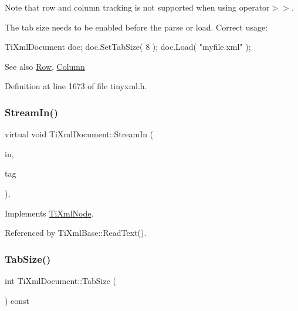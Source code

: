 Note that row and column tracking is not supported when using operator$>$$>$.

The tab size needs to be enabled before the parse or load. Correct usage\+: \begin{DoxyVerb}TiXmlDocument doc;
doc.SetTabSize( 8 );
doc.Load( "myfile.xml" );
\end{DoxyVerb}


\begin{DoxySeeAlso}{See also}
\hyperlink{class_ti_xml_base_ad0cacca5d76d156b26511f46080b442e}{Row}, \hyperlink{class_ti_xml_base_ad283b95d9858d5d78c334f4a61b07bb4}{Column} 
\end{DoxySeeAlso}


Definition at line 1673 of file tinyxml.\+h.

\hypertarget{class_ti_xml_document_ab6d70b2c19e46aedb9903b3c3aa2a568}{}\label{class_ti_xml_document_ab6d70b2c19e46aedb9903b3c3aa2a568} 
\subsubsection{\texorpdfstring{Stream\+In()}{StreamIn()}}
{\footnotesize\ttfamily virtual void Ti\+Xml\+Document\+::\+Stream\+In (\begin{DoxyParamCaption}\item[{std\+::istream $\ast$}]{in,  }\item[{\hyperlink{tinyxml_8h_a92bada05fd84d9a0c9a5bbe53de26887}{T\+I\+X\+M\+L\+\_\+\+S\+T\+R\+I\+NG} $\ast$}]{tag }\end{DoxyParamCaption})\hspace{0.3cm}{\ttfamily [protected]}, {\ttfamily [virtual]}}



Implements \hyperlink{class_ti_xml_node_ab4b4af1a6b486dcbc0e327cf291270af}{Ti\+Xml\+Node}.



Referenced by Ti\+Xml\+Base\+::\+Read\+Text().

\hypertarget{class_ti_xml_document_a81e6ffeee8f5d025a171eabf79abdad7}{}\label{class_ti_xml_document_a81e6ffeee8f5d025a171eabf79abdad7} 
\subsubsection{\texorpdfstring{Tab\+Size()}{TabSize()}}
{\footnotesize\ttfamily int Ti\+Xml\+Document\+::\+Tab\+Size (\begin{DoxyParamCaption}{ }\end{DoxyParamCaption}) const\hspace{0.3cm}{\ttfamily [inline]}}



